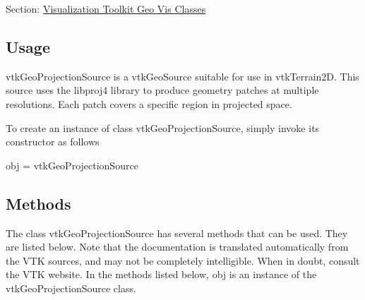 Section\-: \hyperlink{sec_vtkgeovis}{Visualization Toolkit Geo Vis Classes} \hypertarget{vtkwidgets_vtkxyplotwidget_Usage}{}\subsection{Usage}\label{vtkwidgets_vtkxyplotwidget_Usage}
vtk\-Geo\-Projection\-Source is a vtk\-Geo\-Source suitable for use in vtk\-Terrain2\-D. This source uses the libproj4 library to produce geometry patches at multiple resolutions. Each patch covers a specific region in projected space.

To create an instance of class vtk\-Geo\-Projection\-Source, simply invoke its constructor as follows \begin{DoxyVerb}  obj = vtkGeoProjectionSource
\end{DoxyVerb}
 \hypertarget{vtkwidgets_vtkxyplotwidget_Methods}{}\subsection{Methods}\label{vtkwidgets_vtkxyplotwidget_Methods}
The class vtk\-Geo\-Projection\-Source has several methods that can be used. They are listed below. Note that the documentation is translated automatically from the V\-T\-K sources, and may not be completely intelligible. When in doubt, consult the V\-T\-K website. In the methods listed below, {\ttfamily obj} is an instance of the vtk\-Geo\-Projection\-Source class. 
